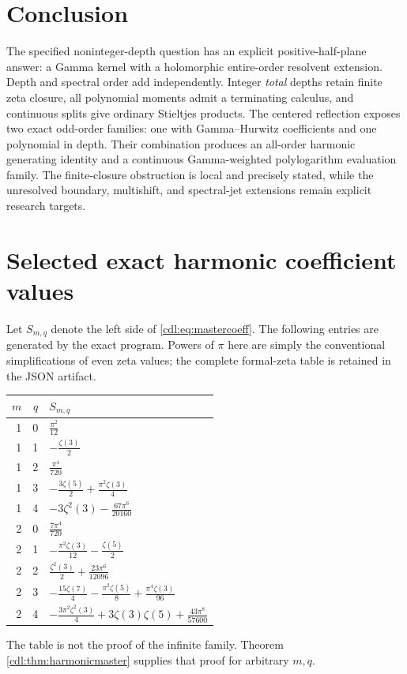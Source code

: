 \documentclass[11pt,letterpaper]{article}
\numberwithin{equation}{section}
\theoremstyle{definition}\newtheorem{definition}[theorem]{Definition}
\theoremstyle{remark}\newtheorem{remark}[theorem]{Remark}
\begin{document}
\section*{Conclusion}
The specified noninteger-depth question has an explicit positive-half-plane
answer: a Gamma kernel with a holomorphic entire-order resolvent extension.
Depth and spectral order add independently. Integer \emph{total} depths
retain finite zeta closure, all polynomial moments admit a terminating
calculus, and continuous splits give ordinary Stieltjes products.
The centered reflection exposes two exact odd-order families: one with
Gamma--Hurwitz coefficients and one polynomial in depth. Their combination
produces an all-order harmonic generating identity and a continuous
Gamma-weighted polylogarithm evaluation family. The finite-closure
obstruction is local and precisely stated, while the unresolved boundary,
multishift, and spectral-jet extensions remain explicit research targets.

\appendix
\section{Selected exact harmonic coefficient values}
\label{cdl:app:coeffs}
Let $S_{m,q}$ denote the left side of \eqref{cdl:eq:mastercoeff}. The
following entries are generated by the exact program. Powers of $\pi$
here are simply the conventional simplifications of even zeta values;
the complete formal-zeta table is retained in the JSON artifact.
\begin{center}
\renewcommand{\arraystretch}{1.35}
\begin{tabular}{@{}rrl@{}}
\toprule
$m$ & $q$ & $S_{m,q}$\\\midrule
1 & 0 & $\frac{\pi^{2}}{12}$ \\
1 & 1 & $- \frac{\zeta\left(3\right)}{2}$ \\
1 & 2 & $\frac{\pi^{4}}{720}$ \\
1 & 3 & $- \frac{3 \zeta\left(5\right)}{2} + \frac{\pi^{2} \zeta\left(3\right)}{4}$ \\
1 & 4 & $- 3 \zeta^{2}\left(3\right) - \frac{67 \pi^{6}}{20160}$ \\
2 & 0 & $\frac{7 \pi^{4}}{720}$ \\
2 & 1 & $- \frac{\pi^{2} \zeta\left(3\right)}{12} - \frac{\zeta\left(5\right)}{2}$ \\
2 & 2 & $\frac{\zeta^{2}\left(3\right)}{2} + \frac{23 \pi^{6}}{12096}$ \\
2 & 3 & $- \frac{15 \zeta\left(7\right)}{4} - \frac{\pi^{2} \zeta\left(5\right)}{8} + \frac{\pi^{4} \zeta\left(3\right)}{96}$ \\
2 & 4 & $- \frac{3 \pi^{2} \zeta^{2}\left(3\right)}{4} + 3 \zeta\left(3\right) \zeta\left(5\right) + \frac{43 \pi^{8}}{57600}$ \\
\bottomrule
\end{tabular}
\end{center}
The table is not the proof of the infinite family. Theorem
\ref{cdl:thm:harmonicmaster} supplies that proof for arbitrary $m,q$.
\end{document}
